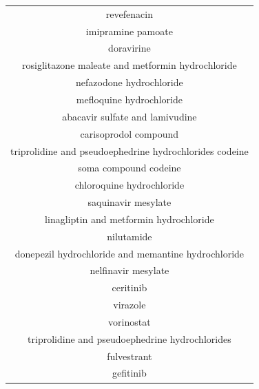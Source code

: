 \documentclass{article}
\newcommand{\lgc}[1]{\cellcolor[gray]{0.85}#1}
\begin{document}
\begin{table}[p]
\begin{tabular}[t]{c}
revefenacin \\
imipramine pamoate \\
doravirine \\
rosiglitazone maleate and metformin hydrochloride \\
nefazodone hydrochloride \\
\lgc{mefloquine hydrochloride\cite{Weston2020.03.25.008482}} \\
abacavir sulfate and lamivudine \\
carisoprodol compound \\
triprolidine and pseudoephedrine hydrochlorides codeine \\
soma compound codeine \\
\lgc{chloroquine hydrochloride\cite{wang2020remdesivir}} \\
\lgc{saquinavir mesylate\cite{Farag2020}} \\
linagliptin and metformin hydrochloride \\
nilutamide \\
\lgc{donepezil hydrochloride and memantine hydrochloride\cite{rejdak2020adamantanes,cimolai2020potentially}} \\
\lgc{nelfinavir mesylate\cite{Xu2020.01.27.921627}} \\
ceritinib \\
\lgc{virazole\cite{khalili2020novel}} \\
vorinostat \\
triprolidine and pseudoephedrine hydrochlorides \\
fulvestrant \\
gefitinib \\
\hline
\end{tabular}
\end{table}
\end{document}
